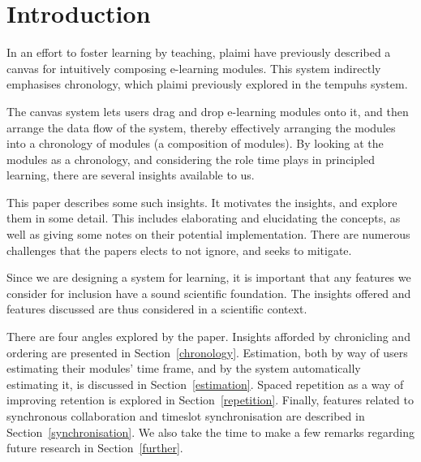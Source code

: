 \section{Introduction}
In an effort to foster learning by teaching, plaimi have previously described 
a canvas for intuitively composing e-learning 
modules\cite{berntsen2015enabling}. This system indirectly emphasises 
chronology, which plaimi previously explored in the tempuhs 
system\cite{berntsen2014tempuhs}.

The canvas system lets users drag and drop e-learning modules onto it, and 
then arrange the data flow of the system, thereby effectively arranging the 
modules into a chronology of modules (a composition of modules). By looking at 
the modules as a chronology, and considering the role time plays in principled 
learning, there are several insights available to us.

This paper describes some such insights. It motivates the insights, and 
explore them in some detail. This includes elaborating and elucidating the 
concepts, as well as giving some notes on their potential implementation. 
There are numerous challenges that the papers elects to not ignore, and seeks 
to mitigate.

Since we are designing a system for learning, it is important that any 
features we consider for inclusion have a sound scientific foundation. The 
insights offered and features discussed are thus considered in a scientific 
context.

There are four angles explored by the paper. Insights afforded by chronicling 
and ordering are presented in Section~\ref{chronology}. Estimation, both by 
way of users estimating their modules' time frame, and by the system 
automatically estimating it, is discussed in Section~\ref{estimation}. Spaced 
repetition as a way of improving retention is explored in 
Section~\ref{repetition}. Finally, features related to synchronous 
collaboration and timeslot synchronisation are described in 
Section~\ref{synchronisation}. We also take the time to make a few remarks 
regarding future research in Section~\ref{further}.
